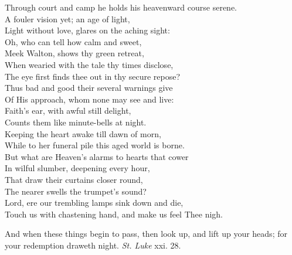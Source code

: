  Through court and camp he holds his heavenward course serene. \\
  A fouler vision yet; an age of light, \\
 Light without love, glares on the aching sight: \\
 Oh, who can tell how calm and sweet, \\
 Meek Walton, shows thy green retreat, \\
 When wearied with the tale thy times disclose, \\
 The eye first finds thee out in thy secure repose? \\
  Thus bad and good their several warnings give \\
 Of His approach, whom none may see and live: \\
 Faith’s ear, with awful still delight, \\
 Counts them like minute-bells at night. \\
 Keeping the heart awake till dawn of morn, \\
 While to her funeral pile this aged world is borne. \\
  But what are Heaven’s alarms to hearts that cower \\
 In wilful slumber, deepening every hour, \\
 That draw their curtains closer round, \\
 The nearer swells the trumpet’s sound? \\
 Lord, ere our trembling lamps sink down and die, \\
 Touch us with chastening hand, and make us feel Thee nigh.\\


And when these things begin to pass, then look up, and lift up your heads; for your redemption draweth night. \emph{St. Luke} xxi. 28.

